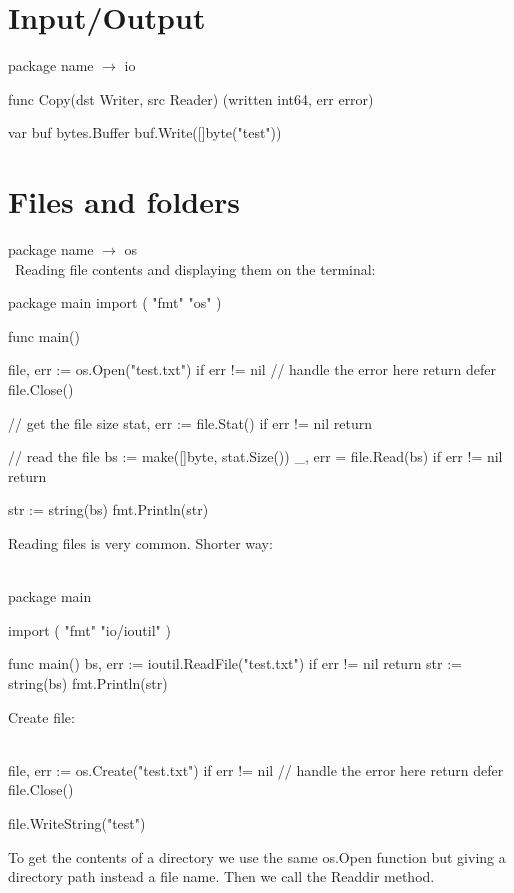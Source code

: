 \documentclass[twoside,a4paper,english]{report}
\begin{document}
\section{Input/Output}
package name $\rightarrow$ io
\begin{go}
func Copy(dst Writer, src Reader) (written
int64, err error)

var buf bytes.Buffer
buf.Write([]byte("test"))   
\end{go}
\section{Files and folders}
package name $\rightarrow$ os\\\
Reading file contents and displaying them on the terminal:
\begin{go}
package main
import (
    "fmt"
    "os"
)

func main() {
    file, err := os.Open("test.txt")
    if err != nil {
        // handle the error here
        return 
    }
    defer file.Close()

    // get the file size
    stat, err := file.Stat()
    if err != nil {
        return 
    }

    // read the file
    bs := make([]byte, stat.Size())
    _, err = file.Read(bs)
    if err != nil {
        return 
    }

    str := string(bs)
    fmt.Println(str)
}
\end{go}
Reading files is very common. Shorter way:\\\\
\begin{go}
package main

import (
     "fmt"
     "io/ioutil"
)

func main() {
    bs, err := ioutil.ReadFile("test.txt")
    if err != nil {
        return 
    }
    str := string(bs)
    fmt.Println(str)
}   
\end{go}
Create file:\\\\
\begin{go}
file, err := os.Create("test.txt")
if err != nil {
    // handle the error here
    return 
}
defer file.Close()

file.WriteString("test")  
\end{go}  
To get the contents of a directory we use the same os.Open function but giving a directory path instead a file name. Then we call the Readdir method. \\\\
\end{document}
